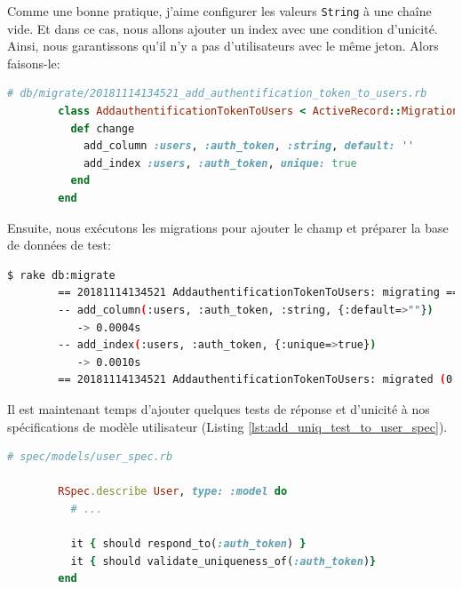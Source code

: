 \documentclass[]{report}
\begin{document}
      Comme une bonne pratique, j'aime configurer les valeurs \verb|String| à une chaîne vide. Et dans ce cas, nous allons ajouter un index avec une condition d'unicité. Ainsi, nous garantissons qu'il n'y a pas d'utilisateurs avec le même jeton. Alors faisons-le:

      \begin{scriptsize}
        \begin{lstlisting}[language=ruby]
        # db/migrate/20181114134521_add_authentification_token_to_users.rb
        class AddauthentificationTokenToUsers < ActiveRecord::Migration[5.2]
          def change
            add_column :users, :auth_token, :string, default: ''
            add_index :users, :auth_token, unique: true
          end
        end
        \end{lstlisting}
      \end{scriptsize}

      Ensuite, nous exécutons les migrations pour ajouter le champ et préparer la base de données de test:

      \begin{scriptsize}
        \begin{lstlisting}[language=bash]
        $ rake db:migrate
        == 20181114134521 AddauthentificationTokenToUsers: migrating ====================
        -- add_column(:users, :auth_token, :string, {:default=>""})
           -> 0.0004s
        -- add_index(:users, :auth_token, {:unique=>true})
           -> 0.0010s
        == 20181114134521 AddauthentificationTokenToUsers: migrated (0.0016s) ===========
        \end{lstlisting}
      \end{scriptsize}

      Il est maintenant temps d'ajouter quelques tests de réponse et d'unicité à nos spécifications de modèle utilisateur (Listing \ref{lst:add_uniq_test_to_user_spec}).

      \begin{scriptsize}
        \begin{lstlisting}[language=ruby, caption={Ajout des tests de réponse et d'unicité}, label={lst:add_uniq_test_to_user_spec}]
        # spec/models/user_spec.rb

        RSpec.describe User, type: :model do
          # ...

          it { should respond_to(:auth_token) }
          it { should validate_uniqueness_of(:auth_token)}
        end
        \end{lstlisting}
      \end{scriptsize}
\end{document}
